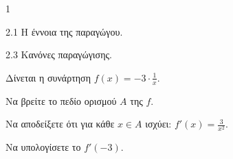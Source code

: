 \begin{ylh}{1}
    \item 2.1 Η έννοια της παραγώγου.
    \item 2.3 Κανόνες παραγώγισης.
\end{ylh}
Δίνεται η συνάρτηση $f(x) = -3 \cdot \frac{1}{x}$.
\begin{alist}
    \item Να βρείτε το πεδίο ορισμού $A$ της $f$. 
    \item Να αποδείξετε ότι για κάθε $x \in A$ ισχύει: $f'(x) = \frac{3}{x^2}$. 
    \item Να υπολογίσετε το $f'(-3)$. 
\end{alist}

